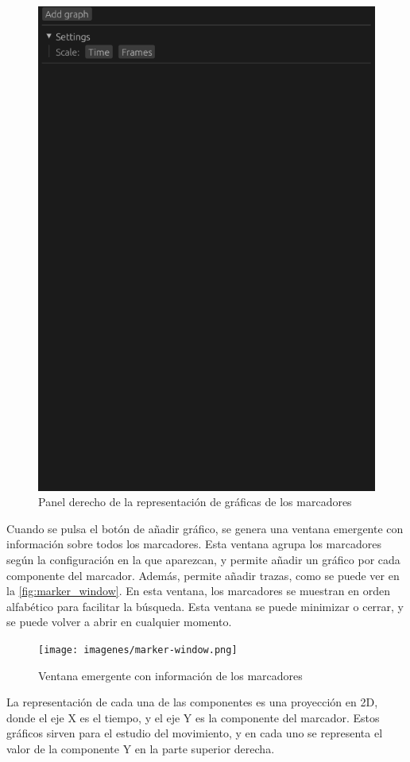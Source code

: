 \begin{figure}[H]
  \centering
  \includegraphics[width=\textwidth]{imagenes/panel-dcho.png}
  \caption{Panel derecho de la representación de gráficas de los marcadores}
  \label{fig:panel_derecho}
\end{figure}

Cuando se pulsa el botón de añadir gráfico, se genera una ventana emergente con información sobre todos los marcadores. Esta ventana agrupa los marcadores según la configuración en la que aparezcan, y permite añadir un gráfico por cada componente del marcador. Además, permite añadir trazas, como se puede ver en la \autoref{fig:marker_window}. En esta ventana, los marcadores se muestran en orden alfabético para facilitar la búsqueda. Esta ventana se puede minimizar o cerrar, y se puede volver a abrir en cualquier momento. 

\begin{figure}[H]
  \centering
  \texttt{[image: imagenes/marker-window.png]}
  \caption{Ventana emergente con información de los marcadores}
  \label{fig:marker_window}
\end{figure}

La representación de cada una de las componentes es una proyección en 2D, donde el eje X es el tiempo, y el eje Y es la componente del marcador. Estos gráficos sirven para el estudio del movimiento, y en cada uno se representa el valor de la componente Y en la parte superior derecha.
